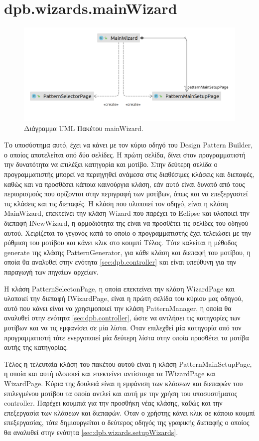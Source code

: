 \section{dpb.wizards.mainWizard}
\label{sec:dpb.wizards.mainWizard}
\begin{figure}[H]
    \centering
    \includegraphics[width=1.0\textwidth]{Figures/mainWizard.png}
    \caption{Διάγραμμα UML Πακέτου mainWizard.}
    \label{fig:mainWizardUML}
\end{figure}
\par
Το υποσύστημα αυτό, έχει να κάνει με τον κύριο οδηγό του Design Pattern Builder, ο οποίος αποτελείται από δύο σελίδες. Η πρώτη σελίδα, 
δίνει στον προγραμματιστή την δυνατότητα να επιλέξει κατηγορία και μοτίβο. Στην δεύτερη σελίδα ο προγραμματιστής μπορεί να περιηγηθεί 
ανάμεσα στις διαθέσιμες κλάσεις και διεπαφές, καθώς και να προσθέσει κάποια καινούργια κλάση, 
εάν αυτό είναι δυνατό από τους περιορισμούς που ορίζονται στην περιγραφή των μοτίβων, 
όπως και να επεξεργαστεί τις κλάσεις και τις διεπαφές. Η κλάση που υλοποιεί τον οδηγό, είναι η κλάση MainWizard, 
επεκτείνει την κλάση Wizard που παρέχει το Eclipse και υλοποιεί την διεπαφή INewWizard, 
η αρμοδιότητα της είναι να προσθέτει τις σελίδες του οδηγού αυτού. Χειρίζεται το γεγονός κατά το 
οποίο ο προγραμματιστής έχει τελειώσει με την ρύθμιση του μοτίβου και κάνει κλικ στο κουμπί Τέλος.
Τότε καλείται η μέθοδος generate της κλάσης PatternGenerator, για κάθε κλάση και διεπαφή του μοτίβου, 
η οποία θα αναλυθεί στην ενότητα \ref{sec:dpb.controller} και είναι υπεύθυνη για την παραγωγή των πηγαίων αρχείων. \par
Η κλάση PatternSelectonPage, η οποία επεκτείνει την κλάση WizardPage και υλοποιεί την διεπαφή IWizardPage, 
είναι η πρώτη σελίδα του κύριου μας οδηγού, αυτό που κάνει είναι να χρησιμοποιεί την κλάση PatternManager, η οποία 
θα αναλυθεί στην ενότητα \ref{sec:dpb.controller}, ώστε να αντλήσει τις κατηγορίες των μοτίβων και να τις εμφανίσει σε μία λίστα. 
Όταν επιλεχθεί μία κατηγορία από τον προγραμματιστή τότε ενεργοποιεί μία δεύτερη λίστα στην οποία προσθέτει 
τα μοτίβα αυτής της κατηγορίας.\par
Τέλος η τελευταία κλάση του πακέτου αυτού είναι η κλάση PatternMainSetupPage, 
η οποία και αυτή υλοποιεί και επεκτείνει αντίστοιχα τα IWizardPage και WizardPage. 
Κύρια της δουλειά είναι η εμφάνιση των κλάσεων και διεπαφών του επιλεγμένου μοτίβου τα οποία αντλεί 
και αυτή με την χρήση του υποσυστήματος controller. Παρέχει κουμπιά για την προσθήκη νέας κλάσης, καθώς και 
την επεξεργασία των κλάσεων και διεπαφών. Όταν ο χρήστης κάνει κλικ σε κάποιο κουμπί επεξεργασίας, τότε δημιουργείται 
ο δεύτερος οδηγός της γραφικής διεπαφής ο οποίος θα αναλυθεί στην ενότητα \ref{sec:dpb.wizards.setupWizards}.
